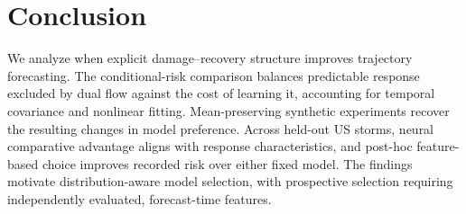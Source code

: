 \FloatBarrier
\section{Conclusion}
We analyze when explicit damage--recovery structure improves trajectory forecasting. The conditional-risk comparison balances predictable response excluded by dual flow against the cost of learning it, accounting for temporal covariance and nonlinear fitting. Mean-preserving synthetic experiments recover the resulting changes in model preference. Across held-out US storms, neural comparative advantage aligns with response characteristics, and post-hoc feature-based choice improves recorded risk over either fixed model. The findings motivate distribution-aware model selection, with prospective selection requiring independently evaluated, forecast-time features.

